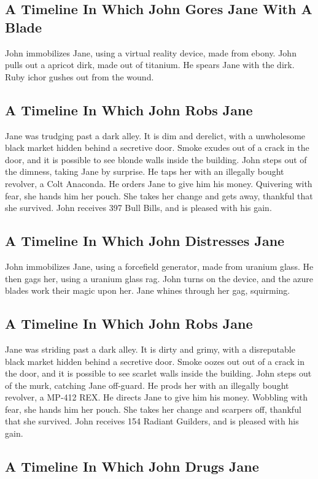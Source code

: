 \documentclass{article}
\begin{document}
\subsection{A Timeline In Which John Gores Jane With A Blade}


John immobilizes Jane, using a virtual reality device, made from ebony.
John pulls out a apricot dirk, made out of titanium.
He spears Jane with the dirk.
Ruby ichor gushes out from the wound.
\subsection{A Timeline In Which John Robs Jane}


Jane was trudging past a dark alley.
It is dim and derelict, with a unwholesome black market hidden behind a secretive door.
Smoke exudes out of a crack in the door, and it is possible to see blonde walls inside the building.
John steps out of the dimness, taking Jane by surprise.
He taps her with an illegally bought revolver, a Colt Anaconda.
He orders Jane to give him his money.
Quivering with fear, she hands him her pouch.
She takes her change and gets away, thankful that she survived.
John receives 397 Bull Bills, and is pleased with his gain.
\subsection{A Timeline In Which John Distresses Jane}


John immobilizes Jane, using a forcefield generator, made from uranium glass.
He then gags her, using a uranium glass rag.
John turns on the device, and the azure blades work their magic upon her.
Jane whines through her gag, squirming.
\subsection{A Timeline In Which John Robs Jane}


Jane was striding past a dark alley.
It is dirty and grimy, with a disreputable black market hidden behind a secretive door.
Smoke oozes out out of a crack in the door, and it is possible to see scarlet walls inside the building.
John steps out of the murk, catching Jane off{-}guard.
He prods her with an illegally bought revolver, a MP{-}412 REX.
He directs Jane to give him his money.
Wobbling with fear, she hands him her pouch.
She takes her change and scarpers off, thankful that she survived.
John receives 154 Radiant Guilders, and is pleased with his gain.
\subsection{A Timeline In Which John Drugs Jane}
\end{document}
